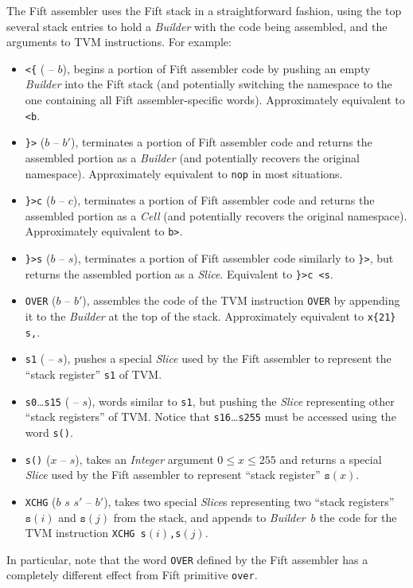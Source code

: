 \documentclass[12pt,oneside]{article}
\begin{document}
The Fift assembler uses the Fift stack in a straightforward fashion, using the top several stack entries to hold a {\em Builder\/} with the code being assembled, and the arguments to TVM instructions. For example:
\begin{itemize}
\item {\tt <\{} ( -- $b$), begins a portion of Fift assembler code by pushing an empty {\em Builder\/} into the Fift stack (and potentially switching the namespace to the one containing all Fift assembler-specific words). Approximately equivalent to {\tt <b}.
\item {\tt \}>} ($b$ -- $b'$), terminates a portion of Fift assembler code and returns the assembled portion as a {\em Builder\/} (and potentially recovers the original namespace). Approximately equivalent to {\tt nop} in most situations.
\item {\tt \}>c} ($b$ -- $c$), terminates a portion of Fift assembler code and returns the assembled portion as a {\em Cell\/} (and potentially recovers the original namespace). Approximately equivalent to {\tt b>}.
\item {\tt \}>s} ($b$ -- $s$), terminates a portion of Fift assembler code similarly to {\tt \}>}, but returns the assembled portion as a {\em Slice\/}. Equivalent to {\tt \}>c <s}.
\item {\tt OVER} ($b$ -- $b'$), assembles the code of the TVM instruction {\tt OVER} by appending it to the {\em Builder\/} at the top of the stack. Approximately equivalent to {\tt x\{21\} s,}.
\item {\tt s1} ( -- $s$), pushes a special {\em Slice\/} used by the Fift assembler to represent the ``stack register'' {\tt s1} of TVM.
\item {\tt s0}\dots{\tt s15} ( -- $s$), words similar to {\tt s1}, but pushing the {\em Slice\/} representing other ``stack registers'' of TVM. Notice that {\tt s16}\dots{\tt s255} must be accessed using the word {\tt s()}.
\item {\tt s()} ($x$ -- $s$), takes an {\em Integer\/} argument $0\leq x\leq 255$ and returns a special {\em Slice\/} used by the Fift assembler to represent ``stack register'' ${\texttt s}(x)$.
\item {\tt XCHG} ($b$ $s$ $s'$ -- $b'$), takes two special {\em Slice\/}s representing two ``stack registers'' ${\texttt s}(i)$ and ${\texttt s}(j)$ from the stack, and appends to {\em Builder\/}~$b$ the code for the TVM instruction {\tt XCHG s$(i)$,s$(j)$}.
\end{itemize}
In particular, note that the word {\tt OVER} defined by the Fift assembler has a completely different effect from Fift primitive {\tt over}.
\end{document}
